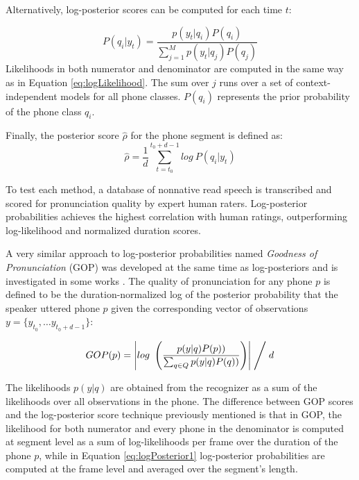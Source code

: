 Alternatively, log-posterior scores can be computed for each time $t$:

\begin{equation}
\label{eq:logPosterior1}
P(q_{i}|y_{t}) = \frac{p(y_{t}|q_{i})P(q_{i})}{\sum\limits_{j=1}^{M} p(y_{t}|q_{j})P(q_{j})}
\end{equation}
Likelihoods in both numerator and denominator are computed in the same way as in
Equation \ref{eq:logLikelihood}.
The sum over $j$ runs over a set of context-independent models for all phone classes. $P(q_{i})$
represents the prior probability of the phone class $q_{i}$.

Finally, the posterior score $\hat{\rho}$ for the phone segment is defined as:
\begin{equation}
\label{eq:logPosterior2}
\hat{\rho} = \frac{1}{d}\sum_{t=t_{0}}^{t_{0}+d-1} log \ P(q_{i}|y_{t})
\end{equation}

To test each method, a database of nonnative read speech is transcribed and scored for
pronunciation quality by expert human raters. Log-posterior probabilities achieves the
highest correlation with human ratings, outperforming log-likelihood and normalized duration
scores.

A very similar approach to log-posterior probabilities named \textit{Goodness of Pronunciation}
(GOP) was developed at the same time as log-posteriors and
is investigated in some works \cite{gop_1, gop_2, gop_3}. The quality of
pronunciation for any phone $p$ is defined to be the duration-normalized log of the posterior
probability that the speaker uttered phone $p$ given the corresponding vector of observations
$y=\{y_{t_{0}}, \dotsc y_{t_{0}+d-1} \}$:

\begin{equation}
\label{eq:gopScore}
GOP(p) = \left| log \ \left(\frac{p(y|q)P(p))}{\sum_{q \in Q}p(y|q)P(q))}\right) \right| \Biggm/ d
\end{equation}

The likelihoods $p(y|q)$ are obtained from the recognizer as a sum of the likelihoods over all
observations in the phone.
The difference between GOP scores and the log-posterior score technique previously mentioned
is that in GOP, the likelihood for both numerator and every phone in the denominator is
computed at segment level as a sum of log-likelihoods per frame over the
duration of the phone $p$, while in Equation \ref{eq:logPosterior1} log-posterior
probabilities are computed at the frame level and averaged over the segment's length.

